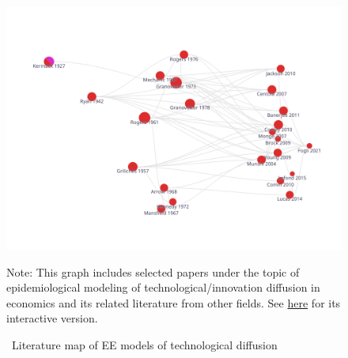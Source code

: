 \begin{figure}[!ht] \centering  %
	\caption{ ~Literature map of EE models of technological diffusion}
	\label{fig:graph_diffusion}
	\centerline{\includegraphics[width=\textwidth]{./figures/graph_diffusion}}
		\begin{flushleft}
{\footnotesize Note: This graph includes selected papers under the topic of epidemiological modeling of technological/innovation diffusion in economics and its related literature from other fields. See \href{https://app.litmaps.co/shared/1D9003CB-75FE-4633-B60A-79B70E03B691}{here} for its interactive version.}
				\end{flushleft}
\end{figure}

\newpage

